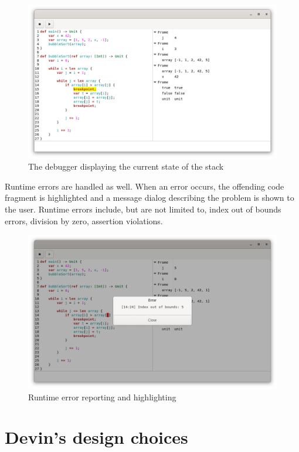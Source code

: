 \documentclass[UdineBachThesis,american,11pt]{PhdThesis}
\begin{document}
  \begin{figure}[h]
    \centering
    \includegraphics[width=\textwidth]{5.png}
    \caption{The debugger displaying the current state of the stack}
  \end{figure}

  Runtime errors are handled as well. When an error occurs, the offending code
  fragment is highlighted and a message dialog describing the problem is shown
  to the user. Runtime errors include, but are not limited to, index out of
  bounds errors, division by zero, assertion violations.

  \begin{figure}[h]
    \centering
    \includegraphics[width=\textwidth]{6.png}
    \caption{Runtime error reporting and highlighting}
  \end{figure}

  \section{Devin's design choices}
\end{document}

